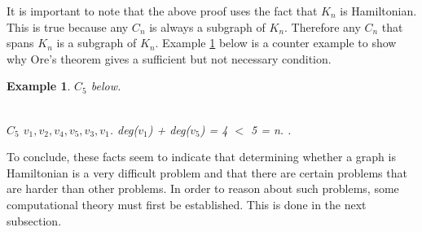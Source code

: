 \documentclass[12pt]{article}
\newtheorem{example}[definition]{Example}
\numberwithin{equation}{subsection}
\numberwithin{table}{subsection}
\begin{document}
It is important to note that the above proof uses the fact that $K_n$ is Hamiltonian. This is true because any $C_n$ is always a subgraph of $K_n$. Therefore any $C_n$ that spans $K_n$ is a subgraph of $K_n$. Example \ref{example 6} below is a counter example to show why Ore's theorem gives a sufficient but not necessary condition.\\
\begin{example}
\label{example 6}
{} $C_5$ below.
\\
\\
$C_5$ {} $v_1, v_2, v_4, v_5, v_3, v_1$. {} deg($v_1$) + deg($v_5$) = 4 $<$ 5 = n. {}.
\end{example} 
To conclude, these facts seem to indicate that determining whether a graph is Hamiltonian is a very difficult problem and that there are certain problems that are harder than other problems. In order to reason about such problems, some computational theory must first be established. This is done in the next subsection.
\end{document}
